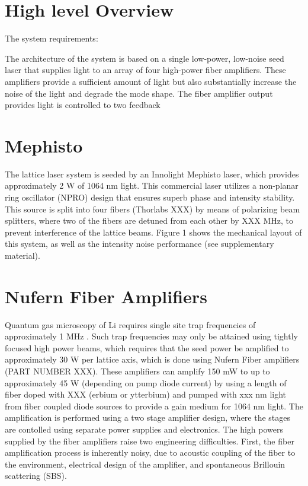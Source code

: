 \documentclass[twocolumn,aps,pra,showpacs,preprintnumbers,bibnotes]{revtex4-1}
\begin{document}
\section{High level Overview}
The system requirements:

The architecture of the system is based on a single low-power, low-noise seed laser that supplies light to an array of four high-power fiber amplifiers.
These amplifiers provide a sufficient amount of light but also substantially increase the noise of the light and degrade the mode shape. 
The fiber amplifier output provides light is controlled to two feedback 

\section{Mephisto}
The lattice laser system is seeded by an Innolight Mephisto laser, which provides approximately 2 W of 1064 nm light. 
This commercial laser utilizes a non-planar ring oscillator (NPRO) design that ensures superb phase and intensity stability. This source is split into four fibers (Thorlabs XXX) by means of polarizing beam splitters, where two of the fibers are detuned from each other by XXX MHz, to prevent interference of the lattice beams. Figure 1 shows the mechanical layout of this system, as well as the intensity noise performance (see supplementary material).


\section{Nufern Fiber Amplifiers}
Quantum gas microscopy of Li requires single site trap frequencies of approximately 1 MHz \cite{Parsons2015}.
Such trap frequencies may only be attained using tightly focused high power beams, which requires that the seed power be amplified to approximately 30 W per lattice axis, which is done using Nufern Fiber amplifiers (PART NUMBER XXX).
These amplifiers can amplify 150 mW to up to approximately 45 W (depending on pump diode current) by using a length of fiber doped with XXX (erbium or ytterbium) and pumped with xxx nm light from fiber coupled diode sources to provide a gain medium for 1064 nm light. 
The amplification is performed using a two stage amplifier design, where the stages are contolled using separate power supplies and electronics.
The high powers supplied by the fiber amplifiers raise two engineering difficulties. First, the fiber amplification process is inherently noisy, due to acoustic coupling of the fiber to the environment, electrical design of the amplifier, and spontaneous Brillouin scattering (SBS). 
\end{document}
